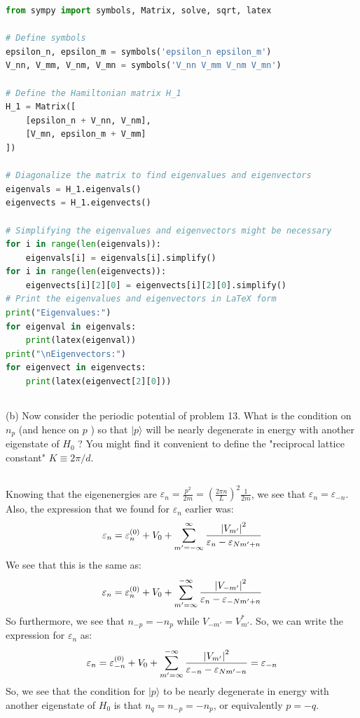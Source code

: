 \documentclass[12pt]{article}
\begin{document}
\begin{lstlisting}[language=Python]
from sympy import symbols, Matrix, solve, sqrt, latex

# Define symbols
epsilon_n, epsilon_m = symbols('epsilon_n epsilon_m')
V_nn, V_mm, V_nm, V_mn = symbols('V_nn V_mm V_nm V_mn')

# Define the Hamiltonian matrix H_1
H_1 = Matrix([
    [epsilon_n + V_nn, V_nm],
    [V_mn, epsilon_m + V_mm]
])

# Diagonalize the matrix to find eigenvalues and eigenvectors
eigenvals = H_1.eigenvals()
eigenvects = H_1.eigenvects()

# Simplifying the eigenvalues and eigenvectors might be necessary
for i in range(len(eigenvals)):
    eigenvals[i] = eigenvals[i].simplify()
for i in range(len(eigenvects)):
    eigenvects[i][2][0] = eigenvects[i][2][0].simplify()
# Print the eigenvalues and eigenvectors in LaTeX form
print("Eigenvalues:")
for eigenval in eigenvals:
    print(latex(eigenval))
print("\nEigenvectors:")
for eigenvect in eigenvects:
    print(latex(eigenvect[2][0]))


\end{lstlisting}


\subsection{}
(b) Now consider the periodic potential of problem 13. What is the condition on $n_{p}$ (and hence on $p$ ) so that $|p\rangle$ will be nearly degenerate in energy with another eigenstate of $H_{0}$ ? You might find it convenient to define the "reciprocal lattice constant" $K \equiv 2 \pi / d$.
\subsection{}
Knowing that the eigenenergies are $\varepsilon_{n}=\frac{p^{2}}{2 m}=\left(\frac{2 \pi n}{L}\right)^{2} \frac{1}{2 m}$, we see that $\varepsilon_{n}=\varepsilon _{-n}$. Also, the expression that we found for $\varepsilon _n$ earlier was:
\begin{equation}
  \varepsilon _{n}=\varepsilon _{n}^{(0)}+V_{0}+\sum_{m'= -\infty}^{\infty}\frac{\abs{V_{m'}}^{2}}{\varepsilon _{n}-\varepsilon _{Nm'+n}}
\end{equation}
We see that this is the same as:
\begin{equation}
  \varepsilon _{n}=\varepsilon _{n}^{(0)}+V_{0}+\sum_{m'= \infty}^{- \infty}\frac{\abs{V_{-m'}}^{2}}{\varepsilon _{n}-\varepsilon _{-Nm'+n}}
\end{equation}
So furthermore, we see that $n_{-p}=-n_{p}$ while $V_{-m'}=V_{m'}^*$. So, we can write the expression for $\varepsilon _n$ as:
\begin{equation}
  \varepsilon _{n}=\varepsilon _{-n}^{(0)}+V_{0}+\sum_{m'= \infty}^{- \infty}\frac{\abs{V_{m'}}^{2}}{\varepsilon _{-n}-\varepsilon _{Nm'-n}} = \varepsilon _{-n}
\end{equation}
So, we see that the condition for $|p\rangle$ to be nearly degenerate in energy with another eigenstate of $H_{0}$ is that $n_q=n_{-p}=-n_{p}$, or equivalently $p=-q$.
\end{document}
